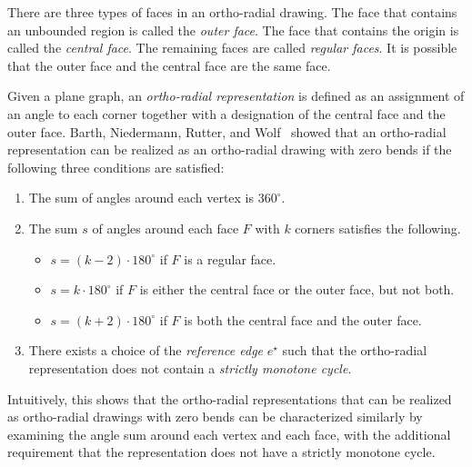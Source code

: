 \documentclass{article}\usepackage[a4paper,margin=20mm]{geometry}
\newcommand{\eref}{e^\star}
\begin{document}

There are three types of faces in an ortho-radial drawing.
The face that contains an unbounded region is called the \emph{outer face}.
The face that contains the origin is called the \emph{central face}. The remaining faces are called \emph{regular faces}. It is possible that the outer face and the central face are the same face.

Given a plane graph, an \emph{ortho-radial representation} is defined as an assignment of an angle to each corner together with a designation of the central face and the outer face.
Barth, Niedermann, Rutter, and Wolf~\cite{barth2023topology}  showed that an ortho-radial representation can be realized as an ortho-radial drawing with zero bends if the  following three conditions are satisfied:
\begin{enumerate}[(R1)]
    \item \label{item:R1} The sum of angles around each vertex is $360^\circ$.
    \item \label{item:R2} The sum $s$ of angles around each face $F$ with $k$ corners satisfies the following.
    \begin{itemize}
        \item $s = (k-2)\cdot 180^\circ$ if $F$ is a regular face.
        \item $s = k\cdot 180^\circ$ if $F$ is either the central face or the outer face, but not both.
        \item $s = (k+2) \cdot 180^\circ$ if $F$ is both the central face and the outer face.
    \end{itemize}
    \item \label{item:R3}There exists a choice of the \emph{reference edge} $\eref$ such that the ortho-radial representation does not contain a \emph{strictly monotone cycle}.
\end{enumerate}

Intuitively, this shows that the ortho-radial representations that can be realized as ortho-radial drawings with zero bends can be characterized similarly by examining the angle sum around each vertex and each face, with the additional requirement that the representation does not have a strictly monotone cycle. 
\end{document}
